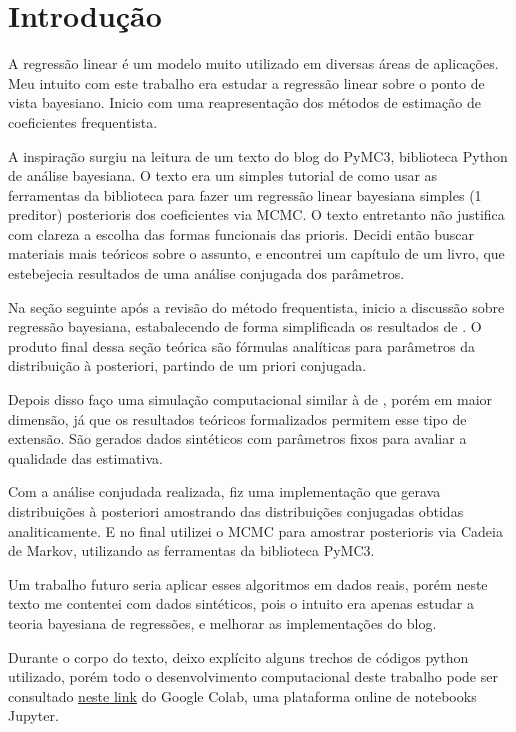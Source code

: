 \documentclass[12pt,letterpaper]{article}
\begin{document}
	\tableofcontents
	\newpage
	\section{Introdução}
	
	A regressão linear é um modelo muito utilizado em diversas áreas de aplicações. Meu intuito com este trabalho era estudar a regressão linear sobre o ponto de vista bayesiano. Inicio com uma reapresentação dos métodos de estimação de coeficientes frequentista. 
	
	A inspiração surgiu na leitura de um texto do blog do PyMC3\cite{pymc3_glm}, biblioteca Python de análise bayesiana. O texto era um simples tutorial de como usar as ferramentas da biblioteca para fazer um regressão linear bayesiana simples (1 preditor) posterioris dos coeficientes via MCMC. O texto entretanto não justifica com clareza a escolha das formas funcionais das prioris. Decidi então buscar materiais mais teóricos sobre o assunto, e encontrei um capítulo de um livro\cite{o1994kendall}, que estebejecia resultados de uma análise conjugada dos parâmetros.
	
	Na seção seguinte após a revisão do método frequentista, inicio a discussão sobre regressão bayesiana, estabalecendo de forma simplificada os resultados de \cite{o1994kendall}. O produto final dessa seção teórica são fórmulas analíticas para parâmetros da distribuição à posteriori, partindo de um priori conjugada.
	
Depois disso faço uma simulação computacional similar à de \cite{pymc3_glm}, porém em maior dimensão, já que os resultados teóricos formalizados permitem esse tipo de extensão. São gerados dados sintéticos com parâmetros fixos para avaliar a qualidade das estimativa.
	
	Com a análise conjudada realizada, fiz uma implementação que gerava distribuições à posteriori amostrando das distribuições conjugadas obtidas analiticamente. E no final utilizei o MCMC para amostrar posterioris via Cadeia de Markov, utilizando as ferramentas da biblioteca PyMC3.
	
	Um trabalho futuro seria aplicar esses algoritmos em dados reais, porém neste texto me contentei com dados sintéticos, pois o intuito era apenas estudar a teoria bayesiana de regressões, e melhorar as implementações do blog\cite{pymc3_glm}.
	
	Durante o corpo do texto, deixo explícito alguns trechos de códigos python utilizado, porém todo o desenvolvimento computacional deste trabalho pode ser consultado \href{https://colab.research.google.com/drive/1fTrA95E2J-WBqXYz_lYunWlpAoco9IBI?usp=sharing}{neste link} do Google Colab, uma plataforma online de notebooks Jupyter.
	\newpage
\end{document}
